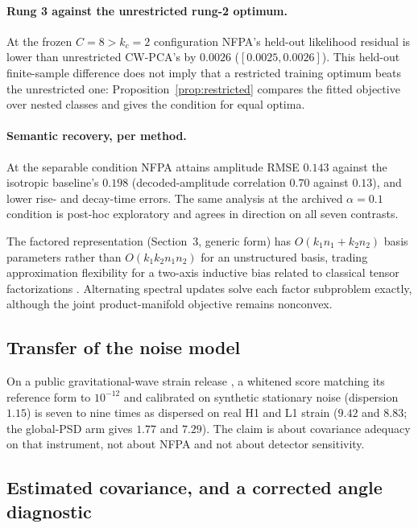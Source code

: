 \paragraph{Rung 3 against the unrestricted rung-2 optimum.} At the frozen $C=8>k_c=2$ configuration NFPA's held-out likelihood residual is lower than unrestricted CW-PCA's by $0.0026$ ($[0.0025,0.0026]$). This held-out finite-sample difference does not imply that a restricted training optimum beats the unrestricted one: Proposition~\ref{prop:restricted} compares the fitted objective over nested classes and gives the condition for equal optima.

\paragraph{Semantic recovery, per method.} At the separable condition NFPA attains amplitude RMSE $0.143$ against the isotropic baseline's $0.198$ (decoded-amplitude correlation $0.70$ against $0.13$), and lower rise- and decay-time errors. The same analysis at the archived $\alpha=0.1$ condition is post-hoc exploratory and agrees in direction on all seven contrasts.

The factored representation (Section~3, generic form) has $O(k_1n_1+k_2n_2)$ basis parameters rather than $O(k_1k_2n_1n_2)$ for an unstructured basis, trading approximation flexibility for a two-axis inductive bias related to classical tensor factorizations \citep{kolda2009,lu2008mpca}. Alternating spectral updates solve each factor subproblem exactly, although the joint product-manifold objective remains nonconvex.

\subsection{Transfer of the noise model}
\label{app:transfer}

On a public gravitational-wave strain release \citep{gwoscgw150914,macleod2021gwpy}, a whitened score matching its reference form to $10^{-12}$ and calibrated on synthetic stationary noise (dispersion $1.15$) is seven to nine times as dispersed on real H1 and L1 strain ($9.42$ and $8.83$; the global-PSD arm gives $1.77$ and $7.29$). The claim is about covariance adequacy on that instrument, not about NFPA and not about detector sensitivity.

\subsection{Estimated covariance, and a corrected angle diagnostic}
\label{app:round10}

